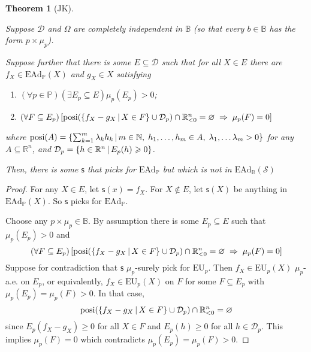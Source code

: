 \documentclass[a4paper]{article}
\newtheorem{theorem}{Theorem}
\DeclareMathOperator{\posi}{posi}
\renewcommand\P{\mathbb{P}} %
\newcommand\EU{\mathrm{EU}}
\newcommand\EAd{\mathrm{EAd}}
\newcommand{\D}{\mathcal{D}}
\newcommand{\Decs}{\mathcal{D}}
\renewcommand\S{\mathcal{S}}
\newcommand\s{\mathsf{s}}
\newcommand{\IB}{\mathbb{B}}
\newcommand{\IP}{\P}
\newcommand{\Strategies}{\S}
\newcommand\SetDelimiter[1][]{
	\nonscript\,#1\vert \allowbreak \nonscript\,\mathopen{}}
\providecommand\given{\SetDelimiter}
\renewcommand{\geq}{\geqslant}
\newenvironment{CCM rewritten}
{\begingroup\color{blue}} %
{\endgroup}              %
\begin{document}
\begin{theorem}[JK]\label{thm:ead-existsimpgen[indep]:JK}




Suppose $\D$ and $\Omega$ are completely independent in $\IB$ (so that every $b\in\IB$ has the form $p\times\mu_p$).
	
	


Suppose further that there is some $E\subseteq\Decs$ such that for all $X\in E$ there are $f_X\in\EAd_\IP(X)$ and $g_X\in X$ satisfying
\begin{enumerate}
\item $(\forall p\in\IP)(\exists E_p\subseteq E)\mu_p(E_p)>0$;
\item $(\forall F\subseteq E_p)\left[\posi(\left\{f_X-g_X\given X\in F\right\}\cup\D_p)\cap\mathbb{R}^n_{<0}=\varnothing\;\Rightarrow\;\mu_p(F)=0\right]$
\end{enumerate}
where $\posi(A)=\left\{\sum_{k=1}^m\lambda_k h_k \given m\in\mathbb{N},\;h_1,\hdots,h_m\in A,\;\lambda_1,\hdots\lambda_m>0\right\}$ for any $A\subseteq\mathbb{R}^n$, and $\D_p=\left\{h\in\mathbb{R}^n\given E_p(h)\geq0\right\}$.

Then, there is some $\s$ that picks for $\EAd_\IP$ but which is not in $\EAd_\IB(\Strategies)$

\end{theorem}
\begin{proof}

	
For any $X\in E$, let $\s(x)=f_X$. For $X\notin E$, let $\s(X)$ be anything in $\EAd_\IP(X)$.  So $\s$ picks for $\EAd_\IP$. 


	Choose any $p\times\mu_p\in\IB$. By assumption there is some $E_p\subseteq E$ such that $\mu_p(E_p)>0$ and
\[
(\forall F\subseteq E_p)\left[\posi(\left\{f_X-g_X\given X\in F\right\}\cup\D_p)\cap\mathbb{R}^n_{<0}=\varnothing\;\Rightarrow\;\mu_p(F)=0\right]
\]
Suppose for contradiction that $\s$ $\mu_p$-surely pick for $\EU_p$. Then $f_X\in\EU_p(X)$ $\mu_p$-a.e. on $E_p$, or equivalently, $f_X\in\EU_p(X)$ on $F$ for some $F\subseteq E_p$ with $\mu_p(E_p)=\mu_p(F)>0$. In that case,
\[
\posi(\left\{f_X-g_X\given X\in F\right\}\cup\D_p)\cap\mathbb{R}^n_{<0}=\varnothing
\]
since	 $E_p(f_X-g_X)\geq0$ for all $X\in F$ and $E_p(h)\geq0$ for all $h\in\D_p$. This implies $\mu_p(F)=0$ which contradicts $\mu_p(E_p)=\mu_p(F)>0$.



	
	\end{proof}
\end{document}
